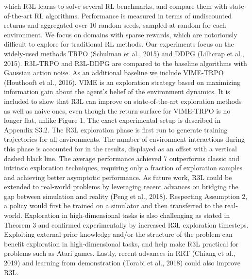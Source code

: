 \documentclass{article}
\begin{document}
which R3L learns to solve several RL benchmarks, and compare them with state-of-the-art RL
algorithms. Performance is measured in terms of undiscounted returns and aggregated over 10
random seeds, sampled at random for each environment. We focus on domains with sparse rewards,
which are notoriously difficult to explore for traditional RL methods. Our experiments focus on the
widely-used methods TRPO (Schulman et al., 2015) and DDPG (Lillicrap et al., 2015). R3L-TRPO
and R3L-DDPG are compared to the baseline algorithms with Gaussian action noise. As an additional
baseline we include VIME-TRPO (Houthooft et al., 2016). VIME is an exploration strategy based on
maximizing information gain about the agent’s belief of the environment dynamics. It is included to
show that R3L can improve on state-of-the-art exploration methods as well as naive ones, even though
the return surface for VIME-TRPO is no longer flat, unlike Figure 1. The exact experimental setup is
described in Appendix S3.2. The R3L exploration phase is first run to generate training trajectories
for all environments. The number of environment interactions during this phase is accounted for in
the results, displayed as an offset with a vertical dashed black line. The average performance achieved
7
outperforms classic and intrinsic exploration techniques, requiring only a fraction of exploration
samples and achieving better asymptotic performance.
As future work, R3L could be extended to real-world problems by leveraging recent advances on
bridging the gap between simulation and reality (Peng et al., 2018). Respecting Assumption 2, a
policy would first be trained on a simulator and then transferred to the real-world. Exploration in
high-dimensional tasks is also challenging as stated in Theorem 3 and confirmed experimentally
by increased R3L exploration timesteps. Exploiting external prior knowledge and/or the structure
of the problem can benefit exploration in high-dimensional tasks, and help make R3L practical for
problems such as Atari games. Lastly, recent advances in RRT (Chiang et al., 2019) and learning
from demonstration (Torabi et al., 2018) could also improve R3L.
\end{document}
